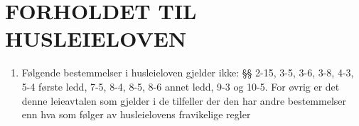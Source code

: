 \section{FORHOLDET TIL HUSLEIELOVEN}


    \begin{enumerate}


        \item Følgende bestemmelser i husleieloven gjelder ikke: §§ 2-15, 3-5, 3-6, 3-8, 4-3, 5-4 første ledd, 7-5, 8-4, 8-5,
        8-6 annet ledd, 9-3 og 10-5. For øvrig er det denne leieavtalen som gjelder i de tilfeller der den har andre
        bestemmelser enn hva som følger av husleielovens fravikelige regler


    \end{enumerate}
